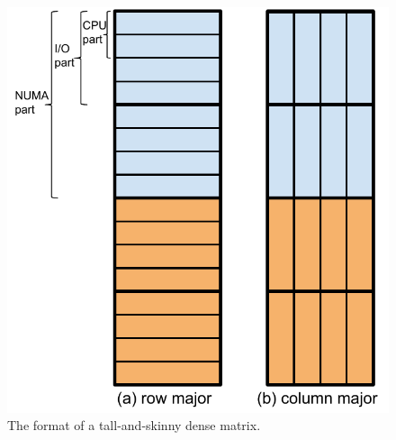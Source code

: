 \begin{figure}
	\centering
	\includegraphics[scale=0.5]{./dense_matrix.pdf}
	\caption{The format of a tall-and-skinny dense matrix.}
	\label{fig:tas_mat}
\end{figure}

